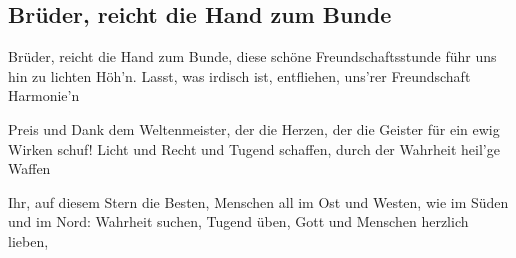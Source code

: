 
\subsection*{Brüder, reicht die Hand zum Bunde}
%
%


\thestrophe Brüder, reicht die Hand zum Bunde, diese schöne Freundschaftsstunde
führ uns hin zu lichten Höh'n. Lasst, was irdisch ist, entfliehen, 
uns'rer Freundschaft Harmonie'n 

\thestrophe Preis und Dank dem Weltenmeister, der die Herzen, der die
Geister für ein ewig Wirken schuf! Licht und Recht und Tugend schaffen, 
durch der Wahrheit heil'ge Waffen  

\thestrophe Ihr, auf diesem Stern die Besten, Menschen all im Ost und
Westen, wie im Süden und im Nord: Wahrheit suchen, Tugend üben, 
Gott und Menschen herzlich lieben, 